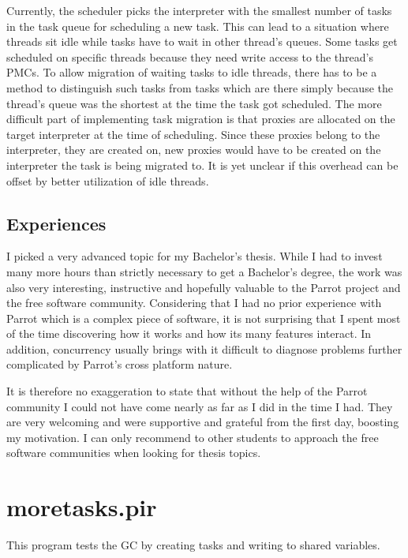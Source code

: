 \documentclass[bachelor,english]{hgbthesis}
\begin{document}
Currently, the scheduler picks the interpreter with the smallest number of tasks in the task queue for scheduling a new task. This can lead to a situation where threads sit idle while tasks have to wait in other thread's queues. Some tasks get scheduled on specific threads because they need write access to the thread's PMCs. To allow migration of waiting tasks to idle threads, there has to be a method to distinguish such tasks from tasks which are there simply because the thread's queue was the shortest at the time the task got scheduled. The more difficult part of implementing task migration is that proxies are allocated on the target interpreter at the time of scheduling. Since these proxies belong to the interpreter, they are created on, new proxies would have to be created on the interpreter the task is being migrated to. It is yet unclear if this overhead can be offset by better utilization of idle threads.

\section{Experiences}

I picked a very advanced topic for my Bachelor's thesis. While I had to invest many more hours than strictly necessary to get a Bachelor's degree, the work was also very interesting, instructive and hopefully valuable to the Parrot project and the free software community. Considering that I had no prior experience with Parrot which is a complex piece of software, it is not surprising that I spent most of the time discovering how it works and how its many features interact. In addition, concurrency usually brings with it difficult to diagnose problems further complicated by Parrot's cross platform nature.

It is therefore no exaggeration to state that without the help of the Parrot community I could not have come nearly as far as I did in the time I had. They are very welcoming and were supportive and grateful from the first day, boosting my motivation. I can only recommend to other students to approach the free software communities when looking for thesis topics.

\appendix
\chapter{moretasks.pir}
\label{app:moretasks}

This program tests the GC by creating tasks and writing to shared variables.
\end{document}
